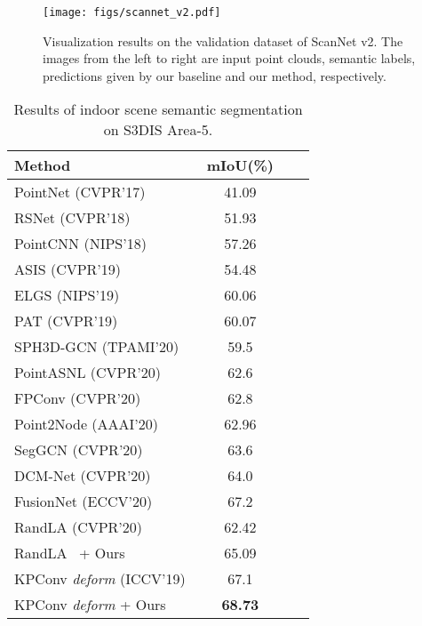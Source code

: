 \documentclass[final]{cvpr}
\begin{document}
\begin{figure}[th]
    \centering
    \texttt{[image: figs/scannet\_v2.pdf]}
    \caption{Visualization results on the validation dataset of ScanNet v2. The images from the left to right are input point clouds, semantic labels, predictions given by our baseline and our method, respectively.}
    \label{fig:scannet}
\end{figure}

\begin{table}
\centering
\begin{tabular}{lccc}  
\toprule
Method  & mIoU(\%) \\
\midrule
PointNet ({\color{blue}CVPR'17})~\cite{qi2017pointnet} & 41.09\\
RSNet ({\color{blue}CVPR'18})~\cite{huang2018recurrent} & 51.93\\
PointCNN ({\color{blue}NIPS'18})~\cite{li2018pointcnn} & 57.26\\
ASIS ({\color{blue}CVPR'19})~\cite{wang2019associatively} & 54.48\\
ELGS ({\color{blue}NIPS'19})~\cite{wang2019exploiting} & 60.06\\
PAT ({\color{blue}CVPR'19})~\cite{yang2019modeling} & 60.07\\
SPH3D-GCN ({\color{blue}TPAMI'20})~\cite{lei2020spherical} & 59.5\\
PointASNL ({\color{blue}CVPR'20})~\cite{yan2020pointasnl} & 62.6 \\
FPConv ({\color{blue}CVPR'20})~\cite{lin2020fpconv} & 62.8 \\
Point2Node ({\color{blue}AAAI'20})~\cite{han2019point2node} & 62.96\\
SegGCN ({\color{blue}CVPR'20})~\cite{lei2020seggcn} & 63.6\\
DCM-Net ({\color{blue}CVPR'20})~\cite{Schult_2020_CVPR} & 64.0\\
FusionNet ({\color{blue}ECCV'20})~\cite{zhang2020deep} & 67.2\\
\midrule
RandLA ({\color{blue}CVPR'20})~\cite{hu2020randla} & 62.42\\
RandLA~\cite{hu2020randla} + Ours & 65.09\\
\midrule
KPConv \textit{deform} ({\color{blue}ICCV'19})~\cite{thomas2019kpconv} & 67.1\\
KPConv \textit{deform} + Ours & \textbf{68.73}\\
\bottomrule
\end{tabular}
\caption{Results of indoor scene semantic segmentation on S3DIS Area-5.}
\label{tab:s3dis}
\end{table}
\end{document}
